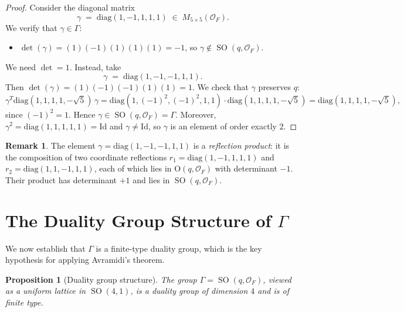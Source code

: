 \documentclass[12pt]{article}
\newtheorem{proposition}[theorem]{Proposition}
\theoremstyle{definition}
\newtheorem{remark}[theorem]{Remark}
\DeclareMathOperator{\SO}{SO}
\begin{document}
\begin{proof}
Consider the diagonal matrix
\begin{equation}\label{eq:involution}
  \gamma \;=\; \mathrm{diag}(1, -1, 1, 1, 1) \;\in\; M_{5 \times 5}(\mathcal{O}_F).
\end{equation}
We verify that $\gamma \in \Gamma$:
\begin{itemize}
  \item $\det(\gamma) = (1)(-1)(1)(1)(1) = -1$, so $\gamma \notin \SO(q, \mathcal{O}_F)$.
\end{itemize}
We need $\det = 1$.  Instead, take
\begin{equation}\label{eq:involution2}
  \gamma \;=\; \mathrm{diag}(1, -1, -1, 1, 1).
\end{equation}
Then $\det(\gamma) = (1)(-1)(-1)(1)(1) = 1$.  We check that $\gamma$ preserves $q$:
\[
  \gamma^T \mathrm{diag}(1,1,1,1,-\sqrt{5})\,\gamma
  = \mathrm{diag}(1, (-1)^2, (-1)^2, 1, 1) \cdot \mathrm{diag}(1,1,1,1,-\sqrt{5})
  = \mathrm{diag}(1,1,1,1,-\sqrt{5}),
\]
since $(-1)^2 = 1$.  Hence $\gamma \in \SO(q, \mathcal{O}_F) = \Gamma$.  Moreover,
$\gamma^2 = \mathrm{diag}(1,1,1,1,1) = \mathrm{Id}$ and $\gamma \neq \mathrm{Id}$,
so $\gamma$ is an element of order exactly $2$.
\end{proof}

\begin{remark}
The element $\gamma = \mathrm{diag}(1,-1,-1,1,1)$ is a \emph{reflection product}: it is the
composition of two coordinate reflections $r_1 = \mathrm{diag}(1,-1,1,1,1)$ and
$r_2 = \mathrm{diag}(1,1,-1,1,1)$, each of which lies in $\mathrm{O}(q,\mathcal{O}_F)$
with determinant $-1$.  Their product has determinant $+1$ and lies in $\SO(q,\mathcal{O}_F)$.
\end{remark}

\section{The Duality Group Structure of $\Gamma$}

We now establish that $\Gamma$ is a finite-type duality group, which is the key hypothesis
for applying Avramidi's theorem.

\begin{proposition}[Duality group structure]\label{prop:duality}
  The group $\Gamma = \SO(q,\mathcal{O}_F)$, viewed as a uniform lattice in $\SO(4,1)$,
  is a duality group of dimension $4$ and is of finite type.
\end{proposition}
\end{document}
